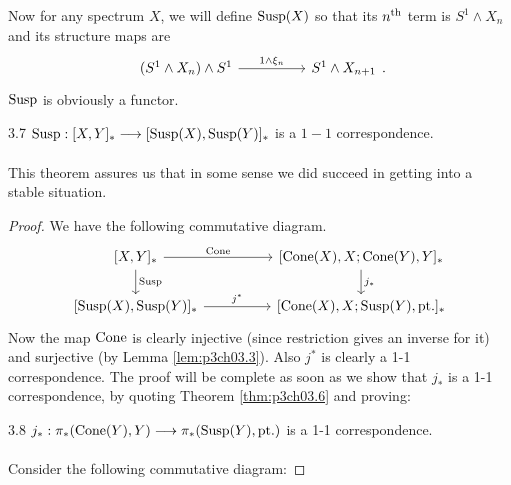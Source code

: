 \documentclass[../main]{subfiles}
\begin{document}
Now for any spectrum $X$, we will define $\mathrm{Susp}(X)$ so that its $n^{\text{th}}$ term is $S^1\wedge X_n$ and its structure maps are 
\[\begin{tikzcd} (S^1\wedge X_n) \wedge S^1 \arrow[rr,"1\wedge \xi_n"]& &S^1\wedge X_{n+1}\end{tikzcd}.\] $\mathrm{Susp}$ is obviously a functor.

\begin{customthm}{3.7}\label{thm:p3ch03.7}
$\te{Susp}:[X,Y]_\ast\lar{} [\te{Susp}(X),\te{Susp}(Y)]_\ast$ is a $1-1$ correspondence.
\end{customthm}
This theorem assures us that in some sense we did succeed in getting into a stable situation.
\begin{proof}
We have the following commutative diagram.
\[\begin{tikzcd}
{[X,Y]_\ast} \arrow[d, "\te{Susp}"] \arrow[rr, "\te{Cone}"] &  & {[\te{Cone}(X),X; \te{Cone}(Y),Y]_\ast} \arrow[d, "j_\ast"] \\
{[\te{Susp}(X),\te{Susp}(Y)]_\ast} \arrow[rr, "j^\ast"]     &  & {[\te{Cone}(X),X; \te{Susp}(Y),\te{pt.}]_\ast}             
\end{tikzcd}\]
Now the map $\mathrm{Cone}$ is clearly injective (since restriction gives an inverse for it) and surjective (by Lemma \ref{lem:p3ch03.3}). Also $j^\ast$ is clearly a 1-1
correspondence. The proof will be complete as soon as we show that $j_\ast$
is a 1-1 correspondence, by quoting Theorem \ref{thm:p3ch03.6} and proving: 

\begin{customlemma}{3.8} \label{lem:p3ch03.8}
$j_\ast : \pi_\ast(\te{Cone}(Y),Y)\lar{} \pi_\ast(\te{Susp}(Y),\te{pt.})$ is a 1-1 correspondence. 
\end{customlemma}


Consider the following commutative diagram:


\end{proof}
\end{document}
